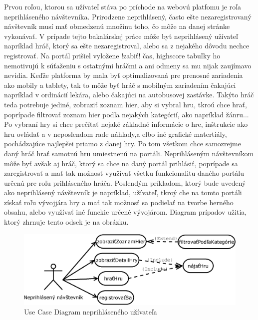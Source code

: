Prvou roľou, ktorou sa užívateľ stáva po príchode na webovú platfomu je roľa neprihláseného návštevníka. Prirodzene neprihlásený, často ešte nezaregistrovaný návštevník musí mať obmedzenú množinu toho, čo môže na danej stránke vykonávať. V prípade tejto bakalárskej práce môže byť neprihlásený užívateľ napríklad hráč, ktorý sa ešte nezaregistroval, alebo sa z nejakého dôvodu nechce registrovať. Na portál prišiel vyložene !zabiť! čas, highscore tabuľky ho nemotivujú k súťaženiu s ostatnými hráčmi a ani odmeny sa mu nijak zaujímavo nevidia. Keďže platforma by mala byť optimalizovaná pre prenosné zariadenia ako mobily a tablety, tak to môže byť hráč s mobilným zariadením čakajúci napríklad v ordinácií lekára, alebo čakajúci na autobusovej zastávke. Takýto hráč teda potrebuje jediné, zobraziť zoznam hier, aby si vybral hru, tkroú chce hrať, poprípade filtrovať zoznam hier podľa nejakých kategórií, ako napríklad žánru... Po vybraní hry si chce prečítať nejaké základné informácie o hre, inštrukcie ako hru ovládať a v neposlendom rade náhľady,a elbo iné grafické matertiály, pochádzajúce najlepšei priamo z danej hry. Po tom všetkom chce samozrejme daný hráč hrať samotnú hru umiestnenú na portáli. Neprihláseným návštevníkom môže byť avšak aj hráč, ktorý sa chce na daný portál prihlásiť, poprípade sa zaregistrovať a mať tak možnosť využívať všetku funkcionalitu daného portálu  určenú pre roľu prihláseného hráča. Poslendým príkladom, ktorý bude uvedený ako neprihlásený návštevník je napríklad, užívateľ, tkroý che na tomto portáli získať roľu vývojjára hry a mať tak možnosť sa podielať na tvorbe herného obsahu, alebo využívať iné funckie určené vývojárom. Diagram prípadov užitia, ktorý zhrnuje tento odsek je na obrázku.
\begin{figure}[h]
  \centering
  \includegraphics[scale=0.4]{fig/ucd-neprihlaseny.eps}
  \caption{Use Case Diagram neprihláseného užívateľa}
  \label{fig:ucdneprihlaseny}
\end{figure}

